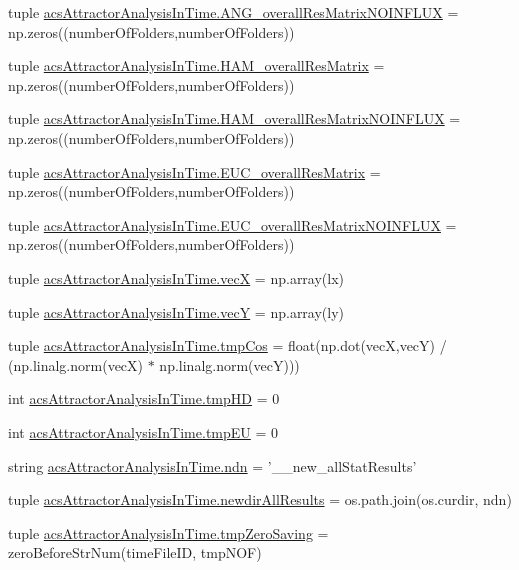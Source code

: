\begin{DoxyCompactItemize}
\item 
tuple \hyperlink{a00091_a7b0e67be0cf8de69432bdf56919d9e33}{acs\-Attractor\-Analysis\-In\-Time.\-A\-N\-G\-\_\-overall\-Res\-Matrix\-N\-O\-I\-N\-F\-L\-U\-X} = np.\-zeros((number\-Of\-Folders,number\-Of\-Folders))
\item 
tuple \hyperlink{a00091_a5e8d5d65865736555e76c3f04058ddd9}{acs\-Attractor\-Analysis\-In\-Time.\-H\-A\-M\-\_\-overall\-Res\-Matrix} = np.\-zeros((number\-Of\-Folders,number\-Of\-Folders))
\item 
tuple \hyperlink{a00091_a6ea74abf4c94200ed1b27d892ecacc97}{acs\-Attractor\-Analysis\-In\-Time.\-H\-A\-M\-\_\-overall\-Res\-Matrix\-N\-O\-I\-N\-F\-L\-U\-X} = np.\-zeros((number\-Of\-Folders,number\-Of\-Folders))
\item 
tuple \hyperlink{a00091_a63ee1925f76a40d04495e9b35c0973d2}{acs\-Attractor\-Analysis\-In\-Time.\-E\-U\-C\-\_\-overall\-Res\-Matrix} = np.\-zeros((number\-Of\-Folders,number\-Of\-Folders))
\item 
tuple \hyperlink{a00091_a4f2ecc559d2c5d79bb138a2e8ced8127}{acs\-Attractor\-Analysis\-In\-Time.\-E\-U\-C\-\_\-overall\-Res\-Matrix\-N\-O\-I\-N\-F\-L\-U\-X} = np.\-zeros((number\-Of\-Folders,number\-Of\-Folders))
\item 
tuple \hyperlink{a00091_a55e7171c96f320a08ad29f21ad5faf9a}{acs\-Attractor\-Analysis\-In\-Time.\-vec\-X} = np.\-array(lx)
\item 
tuple \hyperlink{a00091_aaa4ad55a8fe44bfc5a386dff027886b0}{acs\-Attractor\-Analysis\-In\-Time.\-vec\-Y} = np.\-array(ly)
\item 
tuple \hyperlink{a00091_a547703ec10e432928645bbe8d226dceb}{acs\-Attractor\-Analysis\-In\-Time.\-tmp\-Cos} = float(np.\-dot(vec\-X,vec\-Y) / (np.\-linalg.\-norm(vec\-X) $\ast$ np.\-linalg.\-norm(vec\-Y)))
\item 
int \hyperlink{a00091_a35b7af9eb7cd962d33c5d56eae794c7b}{acs\-Attractor\-Analysis\-In\-Time.\-tmp\-H\-D} = 0
\item 
int \hyperlink{a00091_a9019a56cfd992899ffc519204307a8ae}{acs\-Attractor\-Analysis\-In\-Time.\-tmp\-E\-U} = 0
\item 
string \hyperlink{a00091_ab0e0a55161ee1fd9fb0f086a328f67b7}{acs\-Attractor\-Analysis\-In\-Time.\-ndn} = '\-\_\-\_\-new\-\_\-all\-Stat\-Results'
\item 
tuple \hyperlink{a00091_aaf0f6fcbaaf97dcff16b62e86df0209c}{acs\-Attractor\-Analysis\-In\-Time.\-newdir\-All\-Results} = os.\-path.\-join(os.\-curdir, ndn)
\item 
tuple \hyperlink{a00091_ae86fc9dc3283934244ec28446445f722}{acs\-Attractor\-Analysis\-In\-Time.\-tmp\-Zero\-Saving} = zero\-Before\-Str\-Num(time\-File\-I\-D, tmp\-N\-O\-F)

\end{DoxyCompactItemize}
